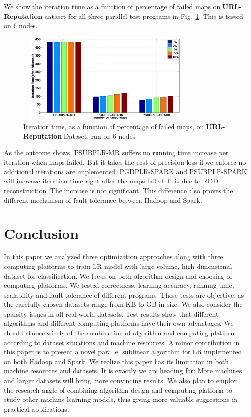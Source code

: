 \documentclass[10pt, conference, compsocconf]{IEEEtran}
\begin{document}
We show the iteration time as a function of percentage of failed maps on \textbf{URL-Reputation} dataset for all three parallel test programs in Fig.~\ref{fig:14}.
This is tested on 6 nodes.
\begin{figure}[tb] \label{fig:14}
\center \includegraphics[height=4.5cm,width=9cm]{img/fault_tolerance.eps}
\caption{Iteration time, as a function of percentage of failed maps, on \textbf{URL-Reputation} Dataset, run on 6 nodes}
\end{figure}
As the outcome shows, PSUBPLR-MR suffers no running time increase per iteration when maps failed. But it takes the cost of precision loss if we enforce no additional iterations are implemented.
PGDPLR-SPARK and PSUBPLR-SPARK will increase iteration time right after the maps failed. It is due to RDD reconstruction. The increase is not significant.
This difference also proves the different mechanism of fault tolerance between Hadoop and Spark.

\section{Conclusion} \label{sec:concl}
In this paper we analyzed three optimization approaches along with three computing platforms to train LR model with large-volume, high-dimensional dataset for classification.
We focus on both algorithm design and choosing of computing platforms.
We tested correctness, learning accuracy, running time, scalability and fault tolerance of different programs.
These tests are objective, as the carefully chosen datasets range from KB to GB in size.
We also consider the sparsity issues in all real world datasets.
Test results show that different algorithms and different computing platforms have their own advantages.
We should choose wisely of the combination of algorithm and computing platform according to dataset situations and machine resources.
A minor contribution in this paper is to present a novel parallel sublinear algorithm for LR implemented on both Hadoop and Spark.
We realize this paper has its limitation in both machine resources and datasets.
It is exactly we are heading for: More machines and larger datasets will bring more convincing results.
We also plan to employ the research angle of combining algorithm design and computing platform to study other machine learning models, thus giving more valuable suggestions in practical applications.
 
\begin{small}


\end{small}
\end{document}
